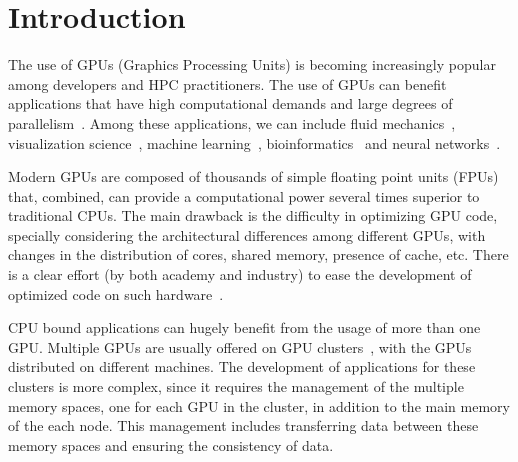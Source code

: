 \documentclass[journal]{IEEEtran}
\begin{document}
%
\IEEEpeerreviewmaketitle

\section{Introduction}


The use of GPUs (Graphics Processing Units) is becoming increasingly popular
among developers and HPC practitioners. The use of GPUs can benefit applications that have high computational demands
and large degrees of parallelism~\cite{gpu2}. Among these
applications, we can include fluid mechanics~\cite{fluid2}, visualization
science~\cite{visualization2}, machine learning~\cite{learning2},
bioinformatics~\cite{bioinformatica2} and neural networks~\cite{neural}.

Modern GPUs are composed of thousands of simple floating point units (FPUs) that,
combined, can provide a computational power several times superior to traditional
CPUs. The main drawback is the difficulty in optimizing GPU code, specially
considering the architectural differences among different GPUs, with changes in
the distribution of cores, shared memory, presence of cache, etc. There is a clear effort (by both academy and industry) to ease the development of optimized code on such hardware~\cite{cuNN, cuMath}.


CPU bound applications can hugely benefit from the usage of
more than one GPU. Multiple GPUs are usually offered on GPU
clusters~\cite{raphael, cluster}, with the GPUs distributed on different machines.
The development of applications for these
clusters is more complex, since it requires the management of the multiple
memory spaces, one for each GPU in the cluster, in addition to the main memory
of the each node. This management includes transferring data between these
memory spaces and ensuring the consistency of data. 
\end{document}
